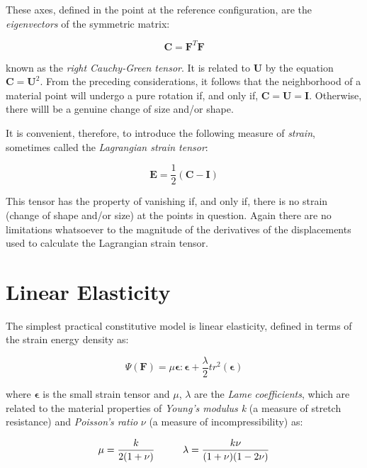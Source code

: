 These axes, defined in the point at the reference configuration, are the \textit{eigenvectors} of the symmetric matrix:

\begin{equation}
\mathbf{C} =  \mathbf{F}^T\mathbf{F}
\end{equation}

known as the \textit{right Cauchy-Green tensor}. It is related to $\textbf{U}$ by the equation $\mathbf{C}=\mathbf{U}^2$.
From the preceding considerations, it follows that the neighborhood of a material point will undergo a pure rotation if, 
and only if, $\mathbf{C}=\mathbf{U}=\mathbf{I}$. Otherwise, there willl be a genuine change of size and/or shape. 


It is convenient, therefore, to introduce the following measure of \textit{strain}, sometimes called the \textit{Lagrangian 
strain tensor}: 


\begin{equation}
\mathbf{E} = \frac{1}{2}(\mathbf{C} - \mathbf{I})
\end{equation}

This tensor has the property of vanishing if, and only if, there is no strain (change of shape and/or size) at the points in question.
Again there are no limitations whatsoever to the magnitude of the derivatives of the displacements used to calculate the Lagrangian
strain tensor. 


\section{Linear Elasticity}
The simplest practical constitutive model is linear elasticity, defined in terms of the strain energy density as:

\begin{equation}
\label{eq:linearelasticity}
 \Psi(\mathbf{F}) = \mu\boldsymbol{\epsilon}:\boldsymbol{\epsilon} + \frac{\lambda}{2}tr^2(\boldsymbol{\epsilon})
\end{equation}

where $\boldsymbol{\epsilon}$ is the small strain tensor and $\mu$, $\lambda$ are the \textit{Lame coefficients}, which are related to
the material properties of \textit{Young's modulus k} (a measure of stretch resistance) and \textit{Poisson's ratio} $\nu$ (a 
measure of incompressibility) as:

\begin{align*}
\mu=\frac{k}{2(1+\nu)} \hspace{10 mm} \lambda=\frac{k\nu}{(1+\nu)(1-2\nu)}
\end{align*}

